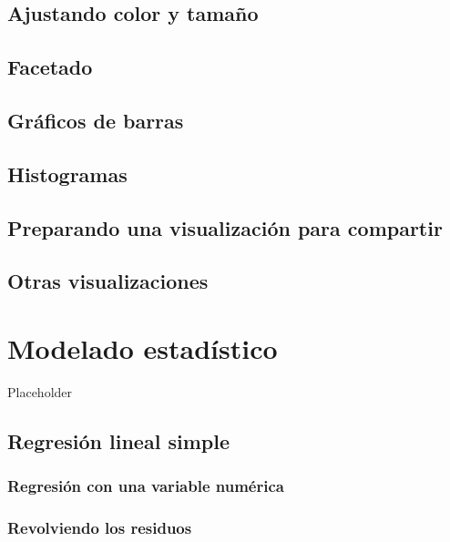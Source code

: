 \documentclass[]{book}
\begin{document}
\section{Ajustando color y tamaño}\label{ajustando-color-y-tamano}

\section{Facetado}\label{facetado}

\section{Gráficos de barras}\label{graficos-de-barras}

\section{Histogramas}\label{histogramas}

\section{Preparando una visualización para
compartir}\label{preparando-una-visualizacion-para-compartir}

\section{Otras visualizaciones}\label{otras-visualizaciones}

\chapter{Modelado estadístico}\label{modelado-estadistico}

Placeholder

\section{Regresión lineal simple}\label{regresion-lineal-simple}

\subsection{Regresión con una variable
numérica}\label{regresion-con-una-variable-numerica}

\subsection{Revolviendo los residuos}\label{revolviendo-los-residuos}
\end{document}
